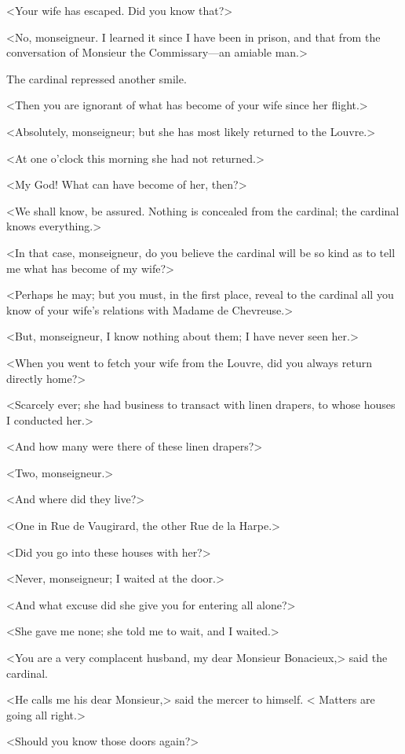 <Your wife has escaped. Did you know that?> 

<No, monseigneur. I learned it since I have been in prison, and that from the conversation of Monsieur the Commissary—an amiable man.> 

The cardinal repressed another smile. 

<Then you are ignorant of what has become of your wife since her flight.> 

<Absolutely, monseigneur; but she has most likely returned to the Louvre.> 

<At one o'clock this morning she had not returned.> 

<My God! What can have become of her, then?> 

<We shall know, be assured. Nothing is concealed from the cardinal; the cardinal knows everything.> 

<In that case, monseigneur, do you believe the cardinal will be so kind as to tell me what has become of my wife?> 

<Perhaps he may; but you must, in the first place, reveal to the cardinal all you know of your wife's relations with Madame de Chevreuse.> 

<But, monseigneur, I know nothing about them; I have never seen her.> 

<When you went to fetch your wife from the Louvre, did you always return directly home?> 

<Scarcely ever; she had business to transact with linen drapers, to whose houses I conducted her.> 

<And how many were there of these linen drapers?> 

<Two, monseigneur.> 

<And where did they live?> 

<One in Rue de Vaugirard, the other Rue de la Harpe.> 

<Did you go into these houses with her?> 

<Never, monseigneur; I waited at the door.> 

<And what excuse did she give you for entering all alone?> 

<She gave me none; she told me to wait, and I waited.> 

<You are a very complacent husband, my dear Monsieur Bonacieux,> said the cardinal. 

<He calls me his dear Monsieur,> said the mercer to himself. < Matters are going all right.> 

<Should you know those doors again?> 

